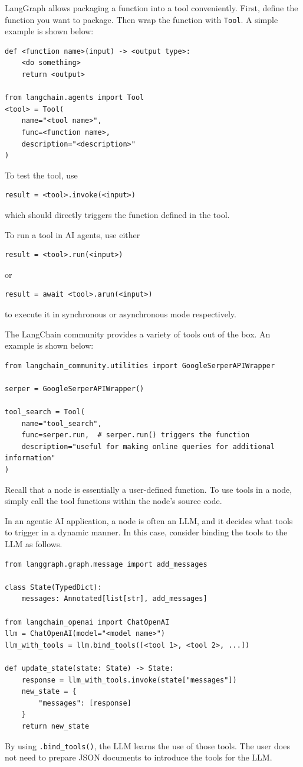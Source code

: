 LangGraph allows packaging a function into a tool conveniently. First, define the function you want to package. Then wrap the function with \verb|Tool|. A simple example is shown below:
\begin{lstlisting}
def <function name>(input) -> <output type>:
    <do something>
    return <output>

from langchain.agents import Tool
<tool> = Tool(
    name="<tool name>",
    func=<function name>,
    description="<description>"
)
\end{lstlisting}

To test the tool, use
\begin{lstlisting}
result = <tool>.invoke(<input>)
\end{lstlisting}
which should directly triggers the function defined in the tool.

To run a tool in AI agents, use either
\begin{lstlisting}
result = <tool>.run(<input>)
\end{lstlisting}
or
\begin{lstlisting}
result = await <tool>.arun(<input>)
\end{lstlisting}
to execute it in synchronous or asynchronous mode respectively.

The LangChain community provides a variety of tools out of the box. An example is shown below:
\begin{lstlisting}
from langchain_community.utilities import GoogleSerperAPIWrapper

serper = GoogleSerperAPIWrapper()

tool_search = Tool(
    name="tool_search",
    func=serper.run,  # serper.run() triggers the function
    description="useful for making online queries for additional information"
)
\end{lstlisting}

Recall that a node is essentially a user-defined function. To use tools in a node, simply call the tool functions within the node’s source code.

In an agentic AI application, a node is often an LLM, and it decides what tools to trigger in a dynamic manner. In this case, consider binding the tools to the LLM as follows.
\begin{lstlisting}
from langgraph.graph.message import add_messages

class State(TypedDict):
    messages: Annotated[list[str], add_messages]
    
from langchain_openai import ChatOpenAI
llm = ChatOpenAI(model="<model name>")
llm_with_tools = llm.bind_tools([<tool 1>, <tool 2>, ...])

def update_state(state: State) -> State:
    response = llm_with_tools.invoke(state["messages"])
    new_state = {
        "messages": [response]
    }
    return new_state
\end{lstlisting}
By using \verb|.bind_tools()|, the LLM learns the use of those tools. The user does not need to prepare JSON documents to introduce the tools for the LLM.

